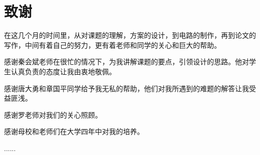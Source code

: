 \chapter*{致谢}

在这几个月的时间里，从对课题的理解，方案的设计，到电路的制作，再到论文的写作，中间有着自己的努力，更有着老师和同学的关心和巨大的帮助。

感谢秦会斌老师在很忙的情况下，为我讲解课题的要点，引领设计的思路。他对学生认真负责的态度让我由衷地敬佩。

感谢唐大勇和章国平同学给予我无私的帮助，他们对我所遇到的难题的解答让我受益匪浅。

感谢罗老师对我们的关心照顾。

感谢母校和老师们在大学四年中对我的培养。

......